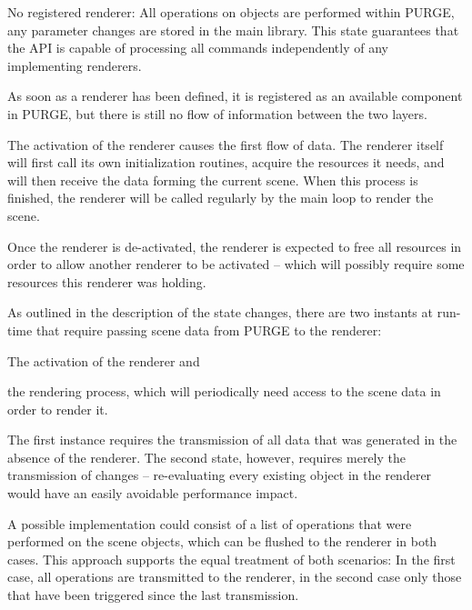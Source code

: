 	\begin{smalllist}
		\item No registered renderer: All operations on objects are performed within PURGE, any parameter changes are stored in the main library. This state guarantees that the API is capable of processing all commands independently of any implementing renderers.
		\item As soon as a renderer has been defined, it is registered as an available component in PURGE, but there is still no flow of information between the two layers.
		\item The activation of the renderer causes the first flow of data. The renderer itself will first call its own initialization routines, acquire the resources it needs, and will then receive the data forming the current scene. When this process is finished, the renderer will be called regularly by the main loop to render the scene.
		\item Once the renderer is de-activated, the renderer is expected to free all resources in order to allow another renderer to be activated -- which will possibly require some resources this renderer was holding.
	\end{smalllist}

	As outlined in the description of the state changes, there are two instants at run-time that require passing scene data from PURGE to the renderer:

	\begin{numlist}
		\item The activation of the renderer and
		\item the rendering process, which will periodically need access to the scene data in order to render it.
	\end{numlist}

	The first instance requires the transmission of all data that was generated in the absence of the renderer. The second state, however, requires merely the transmission of changes -- re-evaluating every existing object in the renderer would have an easily avoidable performance impact.

	A possible implementation could consist of a list of operations that were performed on the scene objects, which can be flushed to the renderer in both cases. This approach supports the equal treatment of both scenarios: In the first case, all operations are transmitted to the renderer, in the second case only those that have been triggered since the last transmission.

